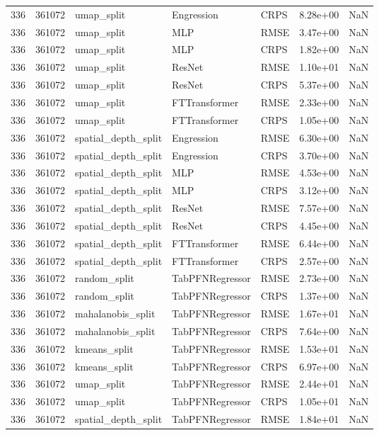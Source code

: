 \begin{tabular}{rrlllrr}
336 & 361072 & umap\_split & Engression & CRPS & 8.28e+00 & NaN \\
336 & 361072 & umap\_split & MLP & RMSE & 3.47e+00 & NaN \\
336 & 361072 & umap\_split & MLP & CRPS & 1.82e+00 & NaN \\
336 & 361072 & umap\_split & ResNet & RMSE & 1.10e+01 & NaN \\
336 & 361072 & umap\_split & ResNet & CRPS & 5.37e+00 & NaN \\
336 & 361072 & umap\_split & FTTransformer & RMSE & 2.33e+00 & NaN \\
336 & 361072 & umap\_split & FTTransformer & CRPS & 1.05e+00 & NaN \\
336 & 361072 & spatial\_depth\_split & Engression & RMSE & 6.30e+00 & NaN \\
336 & 361072 & spatial\_depth\_split & Engression & CRPS & 3.70e+00 & NaN \\
336 & 361072 & spatial\_depth\_split & MLP & RMSE & 4.53e+00 & NaN \\
336 & 361072 & spatial\_depth\_split & MLP & CRPS & 3.12e+00 & NaN \\
336 & 361072 & spatial\_depth\_split & ResNet & RMSE & 7.57e+00 & NaN \\
336 & 361072 & spatial\_depth\_split & ResNet & CRPS & 4.45e+00 & NaN \\
336 & 361072 & spatial\_depth\_split & FTTransformer & RMSE & 6.44e+00 & NaN \\
336 & 361072 & spatial\_depth\_split & FTTransformer & CRPS & 2.57e+00 & NaN \\
336 & 361072 & random\_split & TabPFNRegressor & RMSE & 2.73e+00 & NaN \\
336 & 361072 & random\_split & TabPFNRegressor & CRPS & 1.37e+00 & NaN \\
336 & 361072 & mahalanobis\_split & TabPFNRegressor & RMSE & 1.67e+01 & NaN \\
336 & 361072 & mahalanobis\_split & TabPFNRegressor & CRPS & 7.64e+00 & NaN \\
336 & 361072 & kmeans\_split & TabPFNRegressor & RMSE & 1.53e+01 & NaN \\
336 & 361072 & kmeans\_split & TabPFNRegressor & CRPS & 6.97e+00 & NaN \\
336 & 361072 & umap\_split & TabPFNRegressor & RMSE & 2.44e+01 & NaN \\
336 & 361072 & umap\_split & TabPFNRegressor & CRPS & 1.05e+01 & NaN \\
336 & 361072 & spatial\_depth\_split & TabPFNRegressor & RMSE & 1.84e+01 & NaN \\

\end{tabular}
